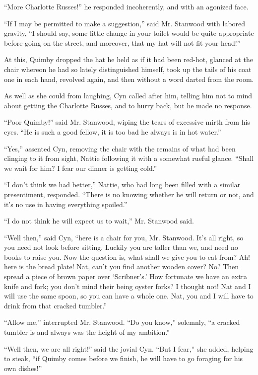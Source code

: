 ``More Charlotte Russes!'' he responded incoherently, and with an agonized
face.

``If I may be permitted to make a suggestion,'' said Mr. Stanwood with
labored gravity, ``I should say, some little change in your toilet would
be quite appropriate before going on the street, and moreover, that my
hat will not fit your head!''

At this, Quimby dropped the hat he held as if it had been red-hot,
glanced at the chair whereon he had so lately distinguished himself,
took up the tails of his coat one in each hand, revolved again, and then
without a word darted from the room.

As well as she could from laughing, Cyn called after him, telling him
not to mind about getting the Charlotte Russes, and to hurry back, but
he made no response.

``Poor Quimby!'' said Mr. Stanwood, wiping the tears of excessive mirth
from his eyes. ``He is such a good fellow, it is too bad he always is in
hot water.''

``Yes,'' assented Cyn, removing the chair with the remains of what had
been clinging to it from sight, Nattie following it with a somewhat
rueful glance. ``Shall we wait for him? I fear our dinner is getting
cold.''

``I don't think we had better,'' Nattie, who had long been filled with a
similar presentiment, responded. ``There is no knowing whether he will
return or not, and it's no use in having everything spoiled.''

``I do not think he will expect us to wait,'' Mr. Stanwood said.

``Well then,'' said Cyn, ``here is a chair for you, Mr. Stanwood. It's all
right, so you need not look before sitting. Luckily you are taller than
we, and need no books to raise you. Now the question is, what shall we
give you to eat from? Ah! here is the bread plate! Nat, can't you find
another wooden cover? No? Then spread a piece of brown paper over
`Scribner's.' How fortunate we have an extra knife and fork; you don't
mind their being oyster forks? I thought not! Nat and I will use the
same spoon, so you can have a whole one. Nat, you and I will have to
drink from that cracked tumbler.''

``Allow me,'' interrupted Mr. Stanwood. ``Do you know,'' solemnly, ``a
cracked tumbler is and always was the height of my ambition.''

``Well then, we are all right!'' said the jovial Cyn. ``But I fear,'' she
added, helping to steak, ``if Quimby comes before we finish, he will have
to go foraging for his own dishes!''

